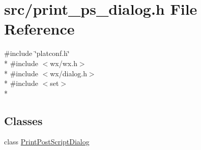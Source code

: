 \hypertarget{a00241}{\section{src/print\-\_\-ps\-\_\-dialog.h File Reference}
\label{a00241}
}
{\ttfamily \#include \char`\"{}platconf.\-h\char`\"{}}\\*
{\ttfamily \#include $<$wx/wx.\-h$>$}\\*
{\ttfamily \#include $<$wx/dialog.\-h$>$}\\*
{\ttfamily \#include $<$set$>$}\\*
\subsection*{Classes}
\begin{DoxyCompactItemize}
\item 
class \hyperlink{a00117}{Print\-Post\-Script\-Dialog}
\end{DoxyCompactItemize}
